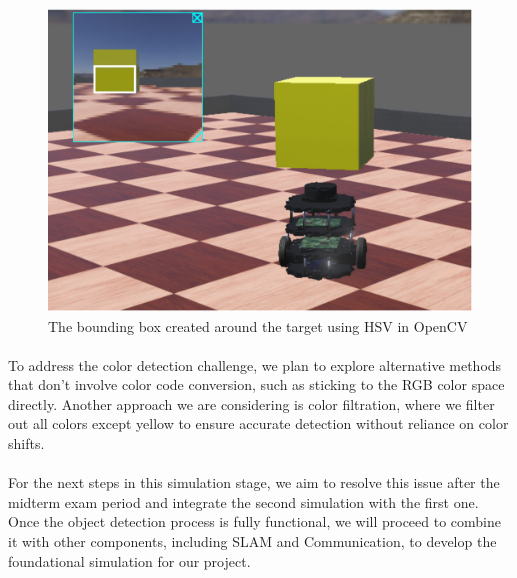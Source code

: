 \begin{figure}[H]
    \centering
    \includegraphics[width=0.8\linewidth]{assets/images/object_detection/Figure5.png}
    \caption{The bounding box created around the target using HSV in OpenCV}
    \label{fig:object detection figure 5.} 
\end{figure}

\paragraph* {}
To address the color detection challenge, we plan to explore alternative methods that don’t involve color code conversion, such as sticking to the RGB color space directly. Another approach we are considering is color filtration, where we filter out all colors except yellow to ensure accurate detection without reliance on color shifts.

\paragraph*{}
For the next steps in this simulation stage, we aim to resolve this issue after the midterm exam period and integrate the second simulation with the first one. Once the object detection process is fully functional, we will proceed to combine it with other components, including SLAM and Communication, to develop the foundational simulation for our project.